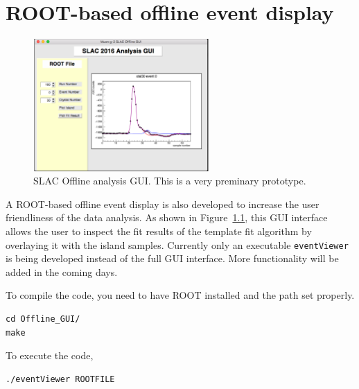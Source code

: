\chapter{ROOT-based offline event display}
\label{chap:five}

\begin{figure}[htbp]
\centering
\includegraphics[width=0.6\textwidth]{pics/SLAC2016_Analysis_GUI}
\caption{SLAC Offline analysis GUI. This is a very preminary prototype.}\label{fig:GUI}
\end{figure}

A ROOT-based offline event display is also developed to increase the user friendliness of the data analysis. As shown in Figure~\ref{fig:GUI}, this GUI interface allows the user to inspect the fit results of the template fit algorithm by overlaying it with the island samples. Currently only an executable \verb+eventViewer+ is being developed instead of the full GUI interface.  More functionality will be added in the coming days. 

To compile the code, you need to have ROOT installed and the path set properly.
%
\begin{Verbatim}[frame=single]
cd Offline_GUI/
make
\end{Verbatim}

To execute the code,
%
\begin{Verbatim}[frame=single]
./eventViewer ROOTFILE
\end{Verbatim}
